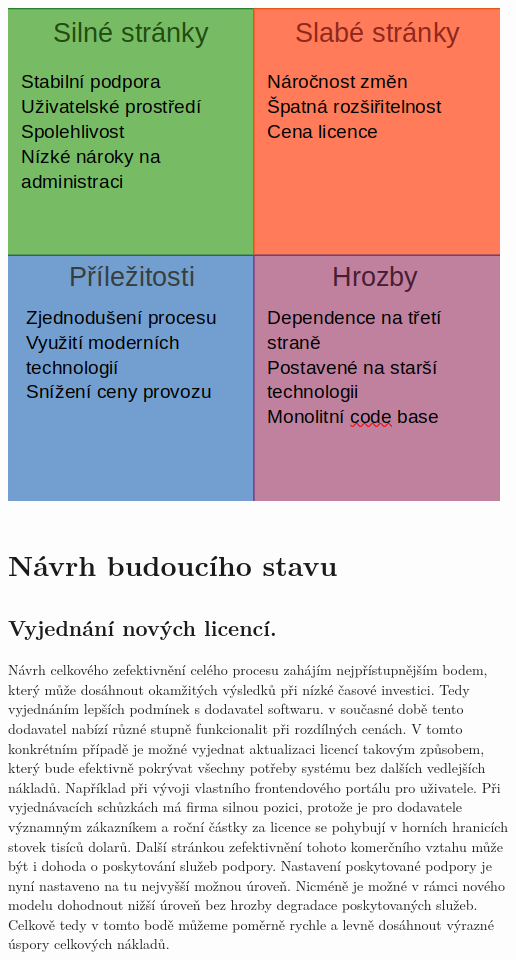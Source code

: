 \documentclass[12pt]{article}
\begin{document}
\begin{sloppypar}
\begin{spacing}{1.15}
        \begin{center}
            \label{SWOT Analýza}
            \includegraphics[scale=0.5]{221129-PIS1-SWOT.png}
        \end{center}

        \section*{Návrh budoucího stavu}
        \subsection*{Vyjednání nových licencí.}

        Návrh celkového zefektivnění celého procesu zahájím nejpřístupnějším
        bodem, který může dosáhnout okamžitých výsledků při nízké časové
        investici. Tedy vyjednáním lepších podmínek s dodavatel softwaru. v
        současné době tento dodavatel nabízí různé stupně funkcionalit při
        rozdílných cenách. V tomto konkrétním případě je možné vyjednat
        aktualizaci licencí takovým způsobem, který bude efektivně pokrývat
        všechny potřeby systému bez dalších vedlejších nákladů. Například při
        vývoji vlastního frontendového portálu pro uživatele. Při vyjednávacích
        schůzkách má firma silnou pozici, protože je pro dodavatele významným
        zákazníkem a roční částky za licence se pohybují v horních hranicích
        stovek tisíců dolarů. Další stránkou zefektivnění  tohoto komerčního 
        vztahu může být i dohoda o poskytování služeb podpory. Nastavení
        poskytované podpory je nyní nastaveno na tu nejvyšší možnou úroveň.
        Nicméně je možné v rámci nového modelu dohodnout nižší úroveň bez hrozby
        degradace poskytovaných služeb. Celkově tedy v tomto bodě můžeme poměrně
        rychle a levně dosáhnout výrazné úspory celkových nákladů.


\end{spacing}
\end{sloppypar}
\end{document}
